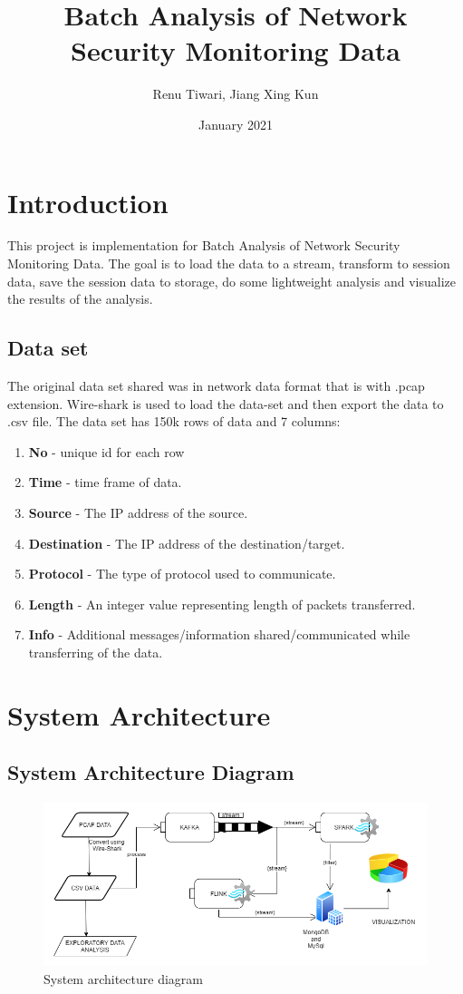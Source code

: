 \documentclass{article}
\title{Batch Analysis of Network Security Monitoring Data}
\author{Renu Tiwari, Jiang Xing Kun}
\date{January 2021}
\begin{document}
\maketitle

\section{Introduction}

This project is implementation for Batch Analysis of Network Security Monitoring Data. The goal is to load the data to a stream, transform to session data, save the session data to storage, do some lightweight analysis and visualize the results of the analysis.

\subsection{Data set}

The original data set shared was in network data format that is with .pcap extension. Wire-shark is used to load the data-set and then export the data to .csv file. The data set has 150k rows of data and 7 columns:
    \begin{enumerate}
    \item \textbf{No} - unique id for each row
    \item \textbf{Time} - time frame of data.
    \item \textbf{Source} - The IP address of the source.
    \item \textbf{Destination} - The IP address of the destination/target.
    \item \textbf{Protocol} - The type of protocol used to communicate.
    \item \textbf{Length} - An integer value representing length of packets transferred.
    \item \textbf{Info} - Additional messages/information shared/communicated while transferring of the data.
    \end{enumerate}
   
\newpage
\section{System Architecture}
\subsection{System Architecture Diagram}

\begin{figure}[h!]
\centering
\includegraphics[scale=0.55]{Architecture.png}
\caption{System architecture diagram}
\label{fig:universe}
\end{figure}
 
\end{document}
